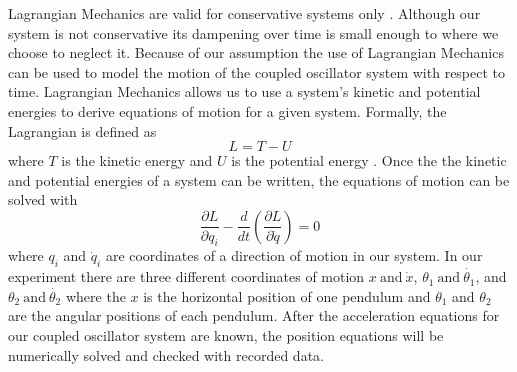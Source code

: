 \documentclass[twocolumn]{article}
\begin{document}
Lagrangian Mechanics are valid for conservative systems only \cite{WikiLagrange}. Although our system is not conservative its dampening over time is small enough to where we choose to neglect it. Because of our assumption the use of Lagrangian Mechanics can be used to model the motion of the coupled oscillator system with respect to time. Lagrangian Mechanics allows us to use a system's kinetic and potential energies to derive equations of motion for a given system. Formally, the Lagrangian is defined as
\begin{equation}\label{Eqn. Lagrangian Definition}
L=T-U
\end{equation}
where $T$ is the kinetic energy and $U$ is the potential energy \cite{WikiLagrange}. Once the the kinetic and potential energies of a system can be written, the equations of motion can be solved with \cite{WikiLagrange}
\begin{equation}\label{Eqn. Lagrangian Extremization}
\frac{\partial L}{\partial q_{i}}-\frac{d}{dt}\left(\frac{\partial L}{\partial \dot{q}}\right)=0
\end{equation}
where $q_i$ and $\dot{q}_i$ are coordinates of a direction of motion in our system. In our experiment there are three different coordinates of motion $x \ \text{and} \ \dot{x}$, $\theta_1 \ \text{and} \ \dot{\theta_1}$, and $\theta_2 \ \text{and} \ \dot{\theta_2}$ where the $x$ is the horizontal position of one pendulum and $\theta_1$ and $\theta_2$ are the angular positions of each pendulum. After the acceleration equations for our coupled oscillator system are known, the position equations will be numerically solved and checked with recorded data.
\end{document}
